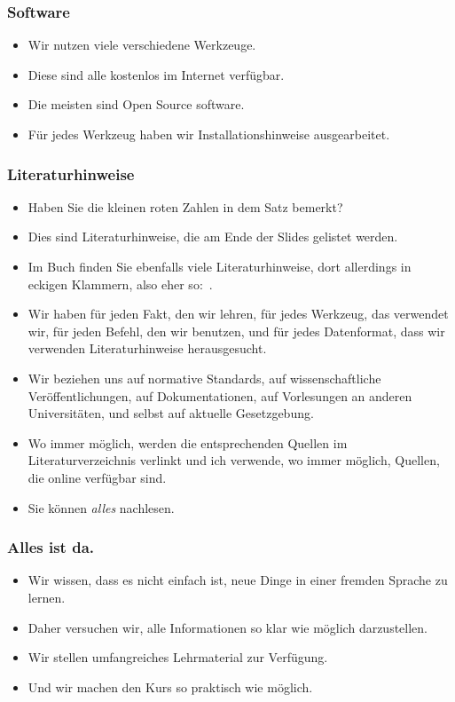 \documentclass[aspectratio=169,mathserif,notheorems]{beamer}%
\begin{document}
%
\begin{frame}%
\frametitle{Software}%
\begin{itemize}%
\item Wir nutzen viele verschiedene Werkzeuge.%
\item<2-> Diese sind alle kostenlos im Internet verfügbar.%
\item<3-> Die meisten sind Open Source software.%
\item<4-> Für jedes Werkzeug haben wir Installationshinweise ausgearbeitet.%
\end{itemize}%
\end{frame}%
%
\begin{frame}%
\frametitle{Literaturhinweise}%
\begin{itemize}%
\item Haben Sie die kleinen roten Zahlen in dem Satz \emph{} bemerkt?%
\item<2-> Dies sind Literaturhinweise, die am Ende der Slides gelistet werden.%
\item<3-> Im Buch \cite{databases} finden Sie ebenfalls viele Literaturhinweise, dort allerdings in eckigen Klammern, also eher so:~.%
\item<4-> Wir haben für jeden Fakt, den wir lehren, für jedes Werkzeug, das verwendet wir, für jeden Befehl, den wir benutzen, und für jedes Datenformat, dass wir verwenden Literaturhinweise herausgesucht.%
\item<5-> Wir beziehen uns auf normative Standards, auf wissenschaftliche Veröffentlichungen, auf Dokumentationen, auf Vorlesungen an anderen Universitäten, und selbst auf aktuelle Gesetzgebung.%
\item<6-> Wo immer möglich, werden die entsprechenden Quellen im Literaturverzeichnis verlinkt und ich verwende, wo immer möglich, Quellen, die online verfügbar sind.%
\item<7-> Sie können \emph{alles} nachlesen.%
\end{itemize}%
\end{frame}%
%
\begin{frame}%
\frametitle{Alles ist da.}%
\begin{itemize}%
\item Wir wissen, dass es nicht einfach ist, neue Dinge in einer fremden Sprache zu lernen.%
\item<2-> Daher versuchen wir, alle Informationen so klar wie möglich darzustellen.%
\item<3-> Wir stellen umfangreiches Lehrmaterial zur Verfügung.%
\item<4-> Und wir machen den Kurs so praktisch wie möglich.%
\end{itemize}%
\end{frame}%
%
\end{document}
